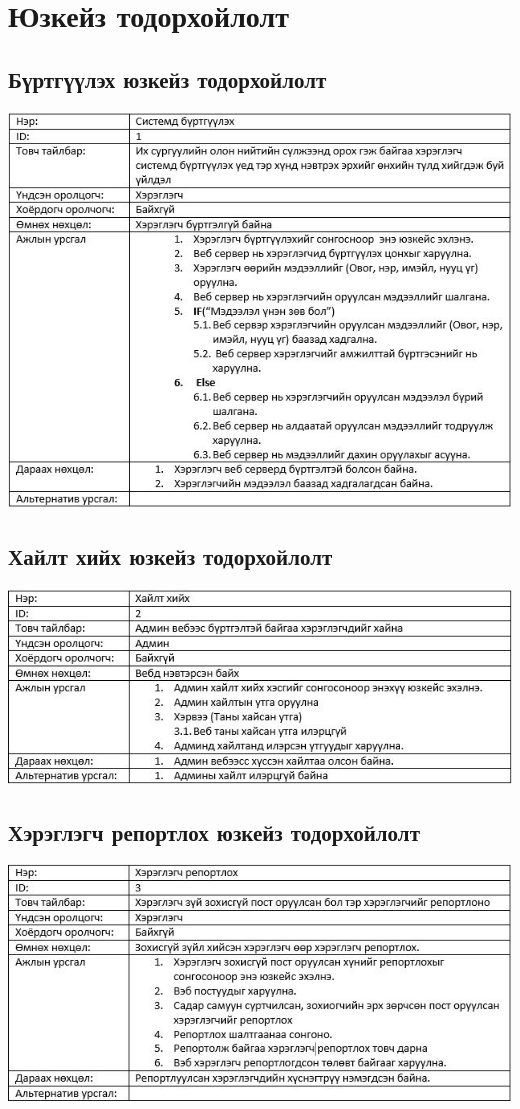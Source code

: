 \documentclass[
oneside, %
english, %
onehalfspacing, %
nolistspacing, %
headsepline, %
]{article} %
\begin{document}
     \section{Юзкейз тодорхойлолт }
      \subsection{Бүртгүүлэх юзкейз тодорхойлолт }
     \includegraphics[width=\textwidth]{usecaseT}
      \subsection{Хайлт хийх юзкейз тодорхойлолт}
     \includegraphics[width=\textwidth]{usecaseT2}
     \subsection{Хэрэглэгч репортлох юзкейз тодорхойлолт }
     \includegraphics[width=\textwidth]{usecaseT3}
\end{document}
